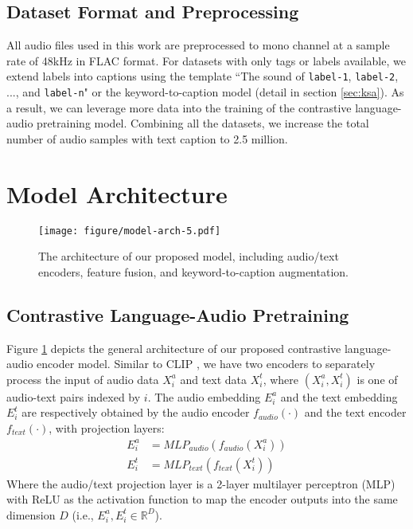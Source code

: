 \vspace{-0.3cm}
\subsection{Dataset Format and Preprocessing}
All audio files used in this work are preprocessed to mono channel at a sample rate of 48kHz in FLAC format. For datasets with only tags or labels available, we extend labels into captions using the template ``The sound of \texttt{label-1}, \texttt{label-2}, ..., and \texttt{label-n}" or the keyword-to-caption model (detail in section \ref{sec:ksa}). As a result, we can leverage more data into the training of the contrastive language-audio pretraining model. Combining all the datasets, we increase the total number of audio samples with text caption to 2.5 million.

\section{Model Architecture}
\begin{figure}[t]
    \centering
    \texttt{[image: figure/model-arch-5.pdf]}
    \caption{The architecture of our proposed model, including audio/text encoders, feature fusion, and keyword-to-caption augmentation.}
    \label{fig:audioclip-arch}
    \vspace{-0.5cm}
\end{figure}

\subsection{Contrastive Language-Audio Pretraining}
Figure \ref{fig:audioclip-arch} depicts the general architecture of our proposed contrastive language-audio encoder model. Similar to CLIP \cite{clip}, we have two encoders to separately process the input of audio data $X_i^a$ and text data $X_i^t$, where $(X_i^a, X_i^t)$ is one of audio-text pairs indexed by $i$. The audio embedding $E_i^{a}$ and the text embedding $E_i^{t}$ are respectively obtained by the audio encoder $f_{audio}(\cdot)$ and the text encoder $f_{text}(\cdot)$, with projection layers:
\begin{align}
    E_i^{a} &= MLP_{audio}(f_{audio}(X_i^a)) \\
    E_i^{t} &= MLP_{text}(f_{text}(X_i^t)) 
\end{align}
Where the audio/text projection layer is a 2-layer multilayer perceptron (MLP) with ReLU \cite{relu} as the activation function to map the encoder outputs into the same dimension $D$ (i.e., $E_i^{a}, E_i^{t} \in \mathbb{R}^D$).

